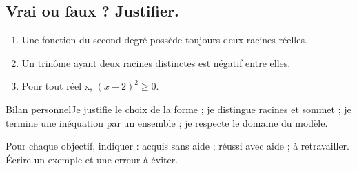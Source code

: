 \subsection*{Vrai ou faux ? Justifier.}\label{C02-VF}
\begin{enumerate}
\item Une fonction du second degré possède toujours deux racines réelles.
\item Un trinôme ayant deux racines distinctes est négatif entre elles.
\item Pour tout réel x, $(x-2)^2\geq0$.
\end{enumerate}
\begin{repere}{Bilan personnel}Je justifie le choix de la forme ; je distingue racines et sommet ; je termine une inéquation par un ensemble ; je respecte le domaine du modèle.

Pour chaque objectif, indiquer : acquis sans aide ; réussi avec aide ; à retravailler. Écrire un exemple et une erreur à éviter.\end{repere}
\endgroup
\ifprof\fi
